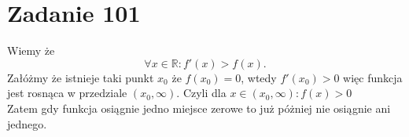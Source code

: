 \documentclass[a4paper,12pt]{article}
\newcommand{\RR}{\mathbb{R}}
\begin{document}
\section*{Zadanie 101}

Wiemy że 
\[
  \forall x \in \RR:  f'(x) > f(x)
.\] 
Załóżmy że istnieje taki punkt $x_0$ że 
$f(x_0) = 0$, wtedy $f'(x_0) > 0$ więc funkcja 
jest rosnąca w przedziale $(x_0, \infty)$.
Czyli dla $x \in \left( x_0, \infty \right): f(x) > 0$\\
Zatem gdy funkcja osiągnie jedno miejsce zerowe to już
póżniej nie osiągnie ani jednego.
\end{document}
